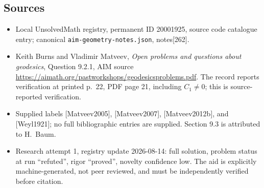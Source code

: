 \documentclass[11pt]{article}
\begin{document}
\subsection{Sources}
\begin{itemize}
\item Local UnsolvedMath registry, permanent ID 20001925, source code catalogue entry; canonical \texttt{aim-geometry-notes.json}, notes[262].
\item Keith Burns and Vladimir Matveev, \emph{Open problems and questions about geodesics}, Question 9.2.1, AIM source \url{https://aimath.org/pastworkshops/geodesicsproblems.pdf}. The record reports verification at printed p.~22, PDF page 21, including $C_1\ne0$; this is source-reported verification.
\item Supplied labels [Matveev2005], [Matveev2007], [Matveev2012b], and [Weyl1921]; no full bibliographic entries are supplied. Section 9.3 is attributed to H.~Baum.
\item Research attempt 1, registry update 2026-08-14: full solution, problem status at run ``refuted'', rigor ``proved'', novelty confidence low. The aid is explicitly machine-generated, not peer reviewed, and must be independently verified before citation.
\end{itemize}
\end{document}
